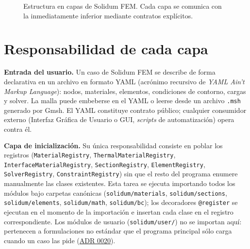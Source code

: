 \documentclass[11pt,oneside]{report}
\begin{document}
\begin{figure}[h]
\caption{Estructura en capas de Solidum FEM. Cada capa se comunica con la inmediatamente inferior mediante contratos explícitos.}
\end{figure}


\section{Responsabilidad de cada capa}

\textbf{Entrada del usuario.} Un caso de Solidum FEM se describe de forma declarativa en un archivo en formato YAML (acrónimo recursivo de \textit{YAML Ain't Markup Language}): nodos, materiales, elementos, condiciones de contorno, cargas y solver. La malla puede embeberse en el YAML o leerse desde un archivo \texttt{.msh} generado por Gmsh. El YAML constituye contrato público; cualquier consumidor externo (Interfaz Gráfica de Usuario o GUI, \textit{scripts} de automatización) opera contra él.

\textbf{Capa de inicialización.} Su única responsabilidad consiste en poblar los registros (\texttt{MaterialRegistry}, \texttt{ThermalMaterialRegistry}, \texttt{InterfaceMaterialRegistry}, \texttt{SectionRegistry}, \texttt{ElementRegistry}, \texttt{SolverRegistry}, \texttt{ConstraintRegistry}) sin que el resto del programa enumere manualmente las clases existentes. Esta tarea se ejecuta importando todos los módulos bajo carpetas canónicas (\texttt{solidum/\allowbreak{}materials}, \texttt{solidum/sections}, \texttt{solidum/elements}, \texttt{solidum/math}, \texttt{solidum/bc}); los decoradores \texttt{@register} se ejecutan en el momento de la importación e insertan cada clase en el registro correspondiente. Los módulos de usuario (\texttt{solidum/user/}) no se importan aquí: pertenecen a formulaciones no estándar que el programa principal sólo carga cuando un caso las pide (\hyperref[adr:0020]{ADR 0020}).
\end{document}
